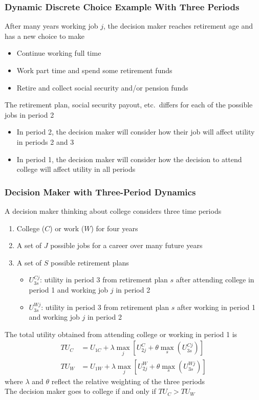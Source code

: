 \documentclass{beamer}
\begin{document}
\begin{frame}\frametitle{Dynamic Discrete Choice Example With Three Periods}
    After many years working job $j$, the decision maker reaches retirement age and has a new choice to make
    \begin{itemize}
    	\item Continue working full time
    	\item Work part time and spend some retirement funds
    	\item Retire and collect social security and/or pension funds
    \end{itemize}
    \vspace{3ex}
    The retirement plan, social security payout, etc.\ differs for each of the possible jobs in period 2
    \begin{itemize}
    	\item In period 2, the decision maker will consider how their job will affect utility in periods 2 and 3
    	\item In period 1, the decision maker will consider how the decision to attend college will affect utility in all periods
    \end{itemize}
\end{frame}

\begin{frame}\frametitle{Decision Maker with Three-Period Dynamics}
    A decision maker thinking about college considers three time periods
    \begin{enumerate}
        \item College ($C$) or work ($W$) for four years
        \item A set of $J$ possible jobs for a career over many future years
        \item A set of $S$ possible retirement plans
        \begin{itemize}
        	\item $U_{3s}^{Cj}$: utility in period 3 from retirement plan $s$ after attending college in period 1 and working job $j$ in period 2
            \item $U_{3s}^{Wj}$: utility in period 3 from retirement plan $s$ after working in period 1 and working job $j$ in period 2
        \end{itemize}
    \end{enumerate}
    \vspace{1ex}
    The total utility obtained from attending college or working in period 1 is
    \begin{align*}
        TU_C & = U_{1C} + \lambda \max_j \left[ U_{2j}^C + \theta \max_s (U_{3s}^{Cj}) \right] \\
        TU_W & = U_{1W} + \lambda \max_j \left[ U_{2j}^W + \theta \max_s (U_{3s}^{Wj}) \right]
    \end{align*}
    where $\lambda$ and $\theta$ reflect the relative weighting of the three periods \\
    \vspace{1ex}
    The decision maker goes to college if and only if $TU_C > TU_W$
\end{frame}
\end{document}
